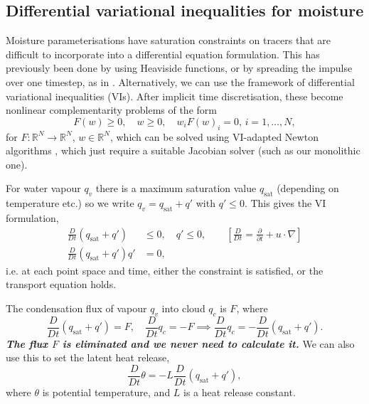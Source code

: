 \documentclass[
]{ImperialPoster}
\DeclareMathOperator{\sat}{sat}
\newcommand{\pp}[2]{\frac{\partial #1}{\partial #2}}
\newcommand{\DD}[2]{\frac{D #1}{D #2}}
\begin{document}
\begin{multicols}{3}
\section{Differential variational inequalities for moisture}
Moisture parameterisations have saturation constraints on tracers that
are difficult to incorporate into a differential equation formulation.
This has previously been done by using Heaviside functions, or by
spreading the impulse over one timestep, as in
\cite{zerroukat2015moist,rostami2018improved}. Alternatively, we can
use the framework of differential variational inequalities
(VIs). After implicit time discretisation, these become nonlinear
complementarity problems of the form
\[
{F}({w}) \geq 0, \quad {w} \geq 0, \quad w_iF(w)_i=0, \, i=1,\ldots,N,
\]
for $F:\mathbb{R}^N\to \mathbb{R}^N$, $w\in \mathbb{R}^N$, which can
be solved using VI-adapted Newton algorithms \cite{bueler2020petsc},
which just require a suitable Jacobian solver (such as our monolithic
one).

For water vapour $q_v$ there is a maximum saturation value $q_{\sat}$
(depending on temperature etc.) so we write $q_v=q_{\sat}+q'$ with
$q'\leq 0$. This gives the VI formulation,
\begin{align*}
\DD{}{t}(q_{\sat}+q') & \leq 0,  \quad
q' \leq 0, \qquad \left[ \DD{}{t} = \pp{}{t} + u\cdot \nabla\right] \\
\DD{}{t}(q_{\sat}+q')q' & = 0, 
\end{align*}
i.e. at each point space and time, either the constraint is satisfied,
or the transport equation holds.

The condensation flux of vapour $q_v$ into cloud $q_c$ is $F$, where
\[
\DD{}{t}(q_{\sat}+q') = F, \quad
\DD{}{t}q_c = -F \implies
\DD{}{t}q_c = -\DD{}{t}(q_{\sat}+q').
\]
\emph{\bfseries The flux $F$ is eliminated and we never need to calculate it.}
We can also use this to set the latent heat release,
\[
\DD{}{t}\theta = -L\DD{}{t}(q_{\sat}+q'),
\]
where $\theta$ is potential temperature, and $L$ is a heat release constant.



\end{multicols}
\end{document}
